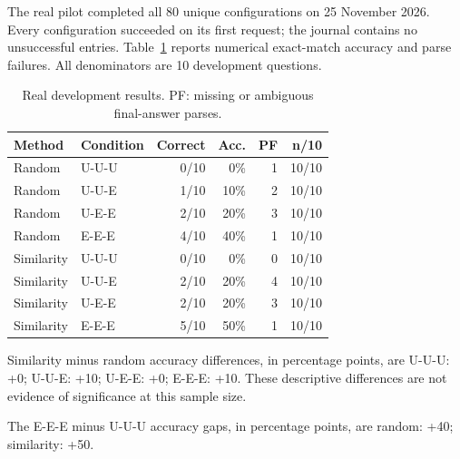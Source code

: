 The real pilot completed all 80 unique configurations on 25 November 2026. Every configuration succeeded on its first request; the journal contains no unsuccessful entries. Table~\ref{tab:pilot} reports numerical exact-match accuracy and parse failures. All denominators are 10 development questions.

\begin{table}[t]

\caption{Real development results. PF: missing or ambiguous final-answer parses.}

\label{tab:pilot}

\centering

\setlength{\tabcolsep}{3pt}

\begin{tabular}{llrrrr}

\toprule

Method & Condition & Correct & Acc. & PF & n/10 \\

\midrule

Random & U-U-U & 0/10 & 0\% & 1 & 10/10 \\

Random & U-U-E & 1/10 & 10\% & 2 & 10/10 \\

Random & U-E-E & 2/10 & 20\% & 3 & 10/10 \\

Random & E-E-E & 4/10 & 40\% & 1 & 10/10 \\

Similarity & U-U-U & 0/10 & 0\% & 0 & 10/10 \\

Similarity & U-U-E & 2/10 & 20\% & 4 & 10/10 \\

Similarity & U-E-E & 2/10 & 20\% & 3 & 10/10 \\

Similarity & E-E-E & 5/10 & 50\% & 1 & 10/10 \\

\bottomrule

\end{tabular}

\end{table}

Similarity minus random accuracy differences, in percentage points, are U-U-U: +0; U-U-E: +10; U-E-E: +0; E-E-E: +10. These descriptive differences are not evidence of significance at this sample size.

The E-E-E minus U-U-U accuracy gaps, in percentage points, are random: +40; similarity: +50.

